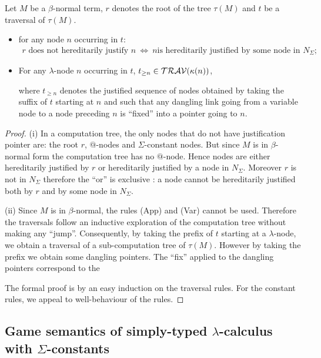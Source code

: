 \begin{lem}
\label{lem:betaeta_trav}
Let $M$ be a $\beta$-normal term, $r$ denotes the root of the tree $\tau(M)$ and
$t$ be a traversal of $\tau(M)$.
\begin{itemize}
\item[(i)] for any node $n$ occurring in $t$:
\begin{eqnarray*}
r \mbox{ does not hereditarily justify } n  \  \iff \   n \mbox{
is hereditarily justified by some node in } N_\Sigma;
\end{eqnarray*}

\item[(ii)] For any $\lambda$-node $n$ occurring in $t$, $t_{\geq n} \in \mathcal{TRAV}(\kappa(n))$,

 where $t_{\geq n}$ denotes the justified sequence of nodes obtained by taking the suffix of $t$ starting at $n$ and
 such that any dangling link going from a variable node to a node preceding $n$ is ``fixed'' into a pointer going to $n$.
 \end{itemize}
\end{lem}
\begin{proof}
(i) In a computation tree, the only nodes that do not have justification pointer are:
the root $r$, $@$-nodes and $\Sigma$-constant nodes.
But since $M$ is in $\beta$-normal form the computation tree has no $@$-node.
Hence nodes are either hereditarily justified by $r$ or
hereditarily justified by a node in $N_\Sigma$. Moreover $r$ is not in
$N_\Sigma$ therefore the ``or'' is exclusive : a node cannot be hereditarily justified both by $r$ and by some node in $N_\Sigma$.

(ii) Since $M$ is in $\beta$-normal, the rules (App) and (Var) cannot be used. Therefore the traversals
follow an inductive exploration of the computation tree without making any ``jump''.
Consequently, by taking the prefix of $t$ starting at a $\lambda$-node, we obtain
a traversal of a sub-computation tree of $\tau(M)$. However by taking the prefix we obtain some dangling pointers.
The ``fix'' applied to the dangling pointers correspond to the


The formal proof is by an easy induction on the traversal rules. For the constant rules, we appeal to well-behaviour of the rules.

\end{proof}


\subsection{Game semantics of simply-typed $\lambda$-calculus with $\Sigma$-constants}

